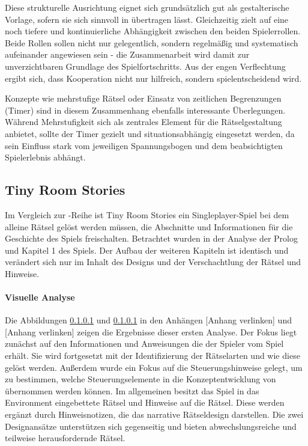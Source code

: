 Diese strukturelle Ausrichtung eignet sich grundsätzlich gut als gestalterische Vorlage, sofern sie sich sinnvoll in  übertragen lässt. Gleichzeitig zielt  auf eine noch tiefere und kontinuierliche Abhängigkeit zwischen den beiden Spielerrollen. Beide Rollen sollen nicht nur gelegentlich, sondern regelmäßig und systematisch aufeinander angewiesen sein - die Zusammenarbeit wird damit zur unverzichtbaren Grundlage des Spielfortschritts. Aus der engen Verflechtung ergibt sich, dass Kooperation nicht nur hilfreich, sondern spielentscheidend wird.

Konzepte wie mehrstufige Rätsel oder Einsatz von zeitlichen Begrenzungen (Timer) sind in diesem Zusammenhang ebenfalls interessante Überlegungen. Während Mehrstufigkeit sich als zentrales Element für die Rätselgestaltung anbietet, sollte der Timer gezielt und situationsabhängig eingesetzt werden, da sein Einfluss stark vom jeweiligen Spannungsbogen und dem beabsichtigten Spielerlebnis abhängt.

\subsection{Tiny Room Stories}
Im Vergleich zur -Reihe ist Tiny Room Stories ein Singleplayer-Spiel bei dem alleine Rätsel gelöst werden müssen, die Abschnitte und Informationen für die Geschichte des Spiels freischalten. Betrachtet wurden in der Analyse der Prolog und Kapitel 1 des Spiels. Der Aufbau der weiteren Kapiteln ist identisch und verändert sich nur im Inhalt des Designs und der Verschachtlung der Rätsel und Hinweise.

\paragraph{Visuelle Analyse}
Die Abbildungen \ref{} und \ref{} in den Anhängen [Anhang verlinken] und [Anhang verlinken] zeigen die Ergebnisse dieser ersten Analyse. Der Fokus liegt zunächst auf den Informationen und Anweisungen die der Spieler vom Spiel erhält. Sie wird fortgesetzt mit der Identifizierung der Rätselarten und wie diese gelöst werden. Außerdem wurde ein Fokus auf die Steuerungshinweise gelegt, um zu bestimmen, welche Steuerungselemente in die Konzeptentwicklung von  übernommen werden können. Im allgemeinen besitzt das Spiel  in das Environment eingebettete Rätsel und Hinweise auf die Rätsel. Diese werden ergänzt durch Hinweisnotizen, die das narrative Rätseldesign darstellen. Die zwei Designansätze unterstützen sich gegenseitig und bieten abwechslungsreiche und teilweise herausfordernde Rätsel.


